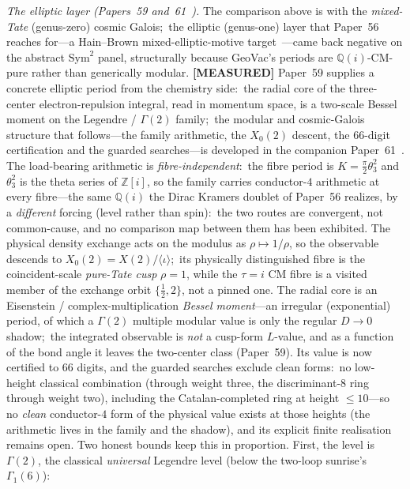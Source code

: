 \documentclass[aps,pra,twocolumn,superscriptaddress,longbibliography]{revtex4-2}
\begin{document}
\emph{The elliptic layer (Papers~59 and~61~\cite{loutey_paper59,loutey_paper61}).}  The comparison above is with the
\emph{mixed-Tate} (genus-zero) cosmic Galois;\ the elliptic (genus-one) layer
that Paper~56 reaches for---a Hain--Brown mixed-elliptic-motive
target~\cite{hain2014,brown2014_mmv}---came
back negative on the abstract $\mathrm{Sym}^2$ panel, structurally because
GeoVac's periods are $\mathbb{Q}(i)$-CM-pure rather than generically modular.
\textbf{[MEASURED]} Paper~59 supplies a concrete elliptic period from the chemistry side:\ the
radial core of the three-center electron-repulsion integral, read in momentum space, is a two-scale
Bessel moment on the Legendre / $\Gamma(2)$ family;\ the modular and
cosmic-Galois structure that follows---the family arithmetic, the $X_0(2)$
descent, the $66$-digit certification and the guarded searches---is developed
in the companion Paper~61~\cite{loutey_paper61}.  The load-bearing arithmetic
is \emph{fibre-independent}:\ the fibre period is $K=\tfrac{\pi}{2}\theta_3^2$
and $\theta_3^2$ is the theta series of $\mathbb{Z}[i]$, so the family carries
conductor-$4$ arithmetic at every fibre---the same $\mathbb{Q}(i)$ the Dirac
Kramers doublet of Paper~56 realizes, by a \emph{different} forcing (level
rather than spin):\ the two routes are convergent, not common-cause, and no
comparison map between them has been exhibited.  The physical density exchange
acts on the modulus as $\rho\mapsto1/\rho$, so the observable descends to
$X_0(2)=X(2)/\langle\iota\rangle$;\ its physically distinguished fibre is the
coincident-scale \emph{pure-Tate cusp} $\rho=1$, while the $\tau=i$ CM fibre is
a visited member of the exchange orbit $\{\tfrac12,2\}$, not a pinned one.  The
radial core is an Eisenstein / complex-multiplication \emph{Bessel
moment}---an irregular (exponential) period, of which a $\Gamma(2)$ multiple
modular value is only the regular $D\to0$ shadow;\ the integrated observable is
\emph{not} a cusp-form $L$-value, and as a function of the bond angle it leaves the two-center
class (Paper~59).  Its value is now certified to $66$ digits, and the guarded searches
exclude clean forms:\ no low-height classical combination (through
weight three, the discriminant-8 ring through weight two), including
the Catalan-completed ring at height $\le10$---so no \emph{clean}
conductor-$4$ form of the physical value exists at those heights (the
arithmetic lives in the family and the shadow), and its explicit finite
realisation remains open.
Two honest bounds keep
this in proportion.  First, the level is $\Gamma(2)$, the classical
\emph{universal} Legendre level (below the two-loop sunrise's $\Gamma_1(6)$):\
\end{document}

